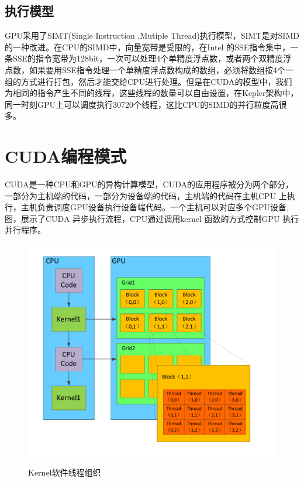 \subsection{执行模型}
GPU采用了SIMT(Single Instruction ,Mutiple Thread)执行模型，SIMT是对SIMD的一种改进。在CPU的SIMD中，向量宽带是受限的，在Intel 的SSE指令集中，一条SSE的指令宽带为128bit，一次可以处理4个单精度浮点数，或者两个双精度浮点数，如果要用SSE指令处理一个单精度浮点数构成的数组，必须将数组按4个一组的方式进行打包，然后才能交给CPU进行处理。但是在CUDA的模型中，我们为相同的指令产生不同的线程，这些线程的数量可以自由设置，在Kepler架构中，同一时刻GPU上可以调度执行30720个线程，这比CPU的SIMD的并行粒度高很多。

\section{CUDA编程模式}
CUDA是一种CPU和GPU的异构计算模型，CUDA的应用程序被分为两个部分，一部分为主机端的代码，一部分为设备端的代码，主机端的代码在主机CPU 上执行，主机负责调度GPU设备执行设备端代码。一个主机可以对应多个GPU设备,图，展示了CUDA 异步执行流程，CPU通过调用kernel 函数的方式控制GPU 执行并行程序。
\begin{figure}
\setlength{\belowcaptionskip}{-0.5cm}
  \begin{center}
    {\includegraphics[width=1 \textwidth]{figures/block.pdf}}
    \end{center}
  \caption{{\footnotesize{Kernel软件线程组织}}}
  \label{ktz}
\end{figure}
